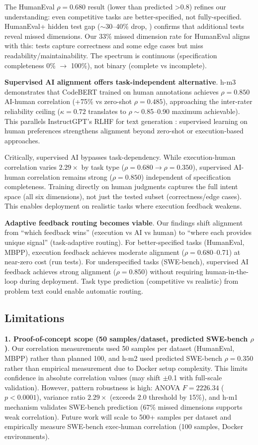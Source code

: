The HumanEval $\rho=0.680$ result (lower than predicted >0.8) refines our understanding: even competitive tasks are better-specified, not fully-specified. HumanEval+ hidden test gap ($\sim$30--40\% drop, \citeauthor{liu2023your} \citeyear{liu2023your}) confirms that additional tests reveal missed dimensions. Our 33\% missed dimension rate for HumanEval aligns with this: tests capture correctness and some edge cases but miss readability/maintainability. The spectrum is continuous (specification completeness 0\% $\rightarrow$ 100\%), not binary (complete vs incomplete).

\textbf{Supervised AI alignment offers task-independent alternative}. h-m3 demonstrates that CodeBERT trained on human annotations achieves $\rho=0.850$ AI-human correlation (+75\% vs zero-shot $\rho=0.485$), approaching the inter-rater reliability ceiling ($\kappa=0.72$ translates to $\rho\sim$0.85--0.90 maximum achievable). This parallels InstructGPT's RLHF for text generation \cite{ouyang2022training}: supervised learning on human preferences strengthens alignment beyond zero-shot or execution-based approaches.

Critically, supervised AI bypasses task-dependency. While execution-human correlation varies $2.29\times$ by task type ($\rho=0.680 \rightarrow \rho=0.350$), supervised AI-human correlation remains strong ($\rho=0.850$) independent of specification completeness. Training directly on human judgments captures the full intent space (all six dimensions), not just the tested subset (correctness/edge cases). This enables deployment on realistic tasks where execution feedback weakens.

\textbf{Adaptive feedback routing becomes viable}. Our findings shift alignment from ``which feedback wins'' (execution vs AI vs human) to ``where each provides unique signal'' (task-adaptive routing). For better-specified tasks (HumanEval, MBPP), execution feedback achieves moderate alignment ($\rho=0.680$--0.71) at near-zero cost (run tests). For underspecified tasks (SWE-bench), supervised AI feedback achieves strong alignment ($\rho=0.850$) without requiring human-in-the-loop during deployment. Task type prediction (competitive vs realistic) from problem text could enable automatic routing.

\subsection{Limitations}

\textbf{1. Proof-of-concept scope (50 samples/dataset, predicted SWE-bench $\rho$)}. Our correlation measurements used 50 samples per dataset (HumanEval, MBPP) rather than planned 100, and h-m2 used predicted SWE-bench $\rho=0.350$ rather than empirical measurement due to Docker setup complexity. This limits confidence in absolute correlation values (may shift $\pm$0.1 with full-scale validation). However, pattern robustness is high: ANOVA $F=2226.34$ ($p<0.0001$), variance ratio $2.29\times$ (exceeds 2.0 threshold by 15\%), and h-m1 mechanism validates SWE-bench prediction (67\% missed dimensions supports weak correlation). Future work will scale to 500+ samples per dataset and empirically measure SWE-bench exec-human correlation (100 samples, Docker environments).

